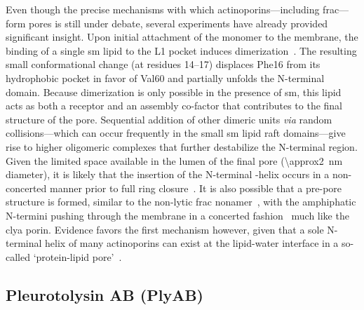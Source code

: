 Even though the precise mechanisms with which actinoporins---including \gls{frac}---form pores is still under
debate, several experiments have already provided significant insight. Upon initial attachment of the monomer
to the membrane, the binding of a single \gls{sm} lipid to the L1 pocket induces
dimerization~\cite{Tanaka-2015}. The resulting small conformational change (at residues 14--17) displaces
Phe16 from its hydrophobic pocket in favor of Val60 and partially unfolds the N-terminal domain. Because
dimerization is only possible in the presence of \gls{sm}, this lipid acts as both a receptor and an assembly
co-factor that contributes to the final structure of the pore. Sequential addition of other dimeric units
\textit{via} random collisions---which can occur frequently in the small \gls{sm} lipid raft domains---give
rise to higher oligomeric complexes that further destabilize the N-terminal region. Given the limited space
available in the lumen of the final pore (\SI{\approx2}{\nm} diameter), it is likely that the insertion of the
N-terminal \ta-helix occurs in a non-concerted manner prior to full ring closure~\cite{Cosentino-2016}. It is
also possible that a pre-pore structure is formed, similar to the non-lytic \gls{frac}
nonamer~\cite{Mechaly-2011}, with the amphiphatic N-termini pushing through the membrane in a concerted
fashion~\cite{Tanaka-2015,Rojko-2016} much like the \gls{clya} porin. Evidence favors the first mechanism
however, given that a sole N-terminal helix of many actinoporins can exist at the lipid-water interface in a
so-called `protein-lipid pore'~\cite{Cosentino-2016}.

%
\clearpage
%

\subsection{Pleurotolysin AB (PlyAB)}
%
\label{sec:np:plyab}
%

